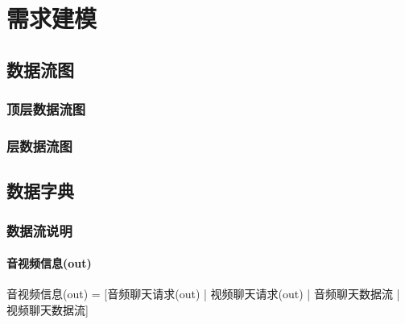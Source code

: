 \chapter{需求建模 }
    \section{数据流图}

        \subsection{顶层数据流图}

        \subsection{层数据流图}

    \section{数据字典}

        \subsection{数据流说明}
            
            \subsubsection{音视频信息(out)}
                音视频信息(out) = [音频聊天请求(out) | 视频聊天请求(out) | 音频聊天数据流 | 视频聊天数据流]
